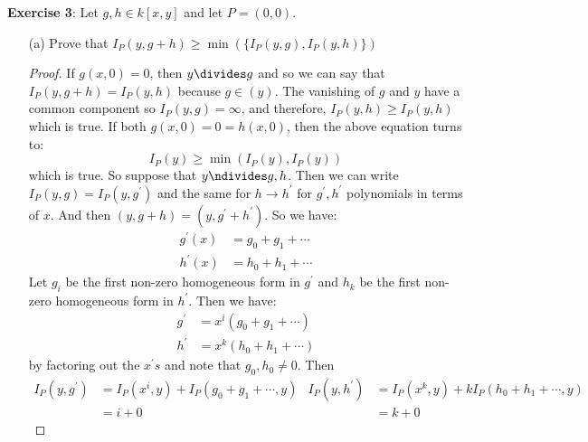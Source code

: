 \documentclass{article}
\begin{document}
\textbf{Exercise 3}: Let $g, h \in k[x, y]$ and let $P = (0, 0)$.
    \begin{itemize}
        \item [(a)] Prove that $I_{P}(y, g + h) \geq \min(\{I_{P}(y, g), I_{P}(y, h)\})$
            \begin{proof}
                If $g(x, 0) = 0$, then $y \divides g$ and so we can say that $I_{P}(y, g + h) = I_{P}(y, h)$ because $g \in(y)$. The vanishing of $g$ and $y$ have a common component so $I_{P}(y, g) = \infty$, and therefore, $I_{P}(y, h) \geq I_{P}(y, h)$ which is true. If both $g(x, 0) = 0 = h(x, 0)$, then the above equation turns to:
                    \begin{equation*}
                        I_{P}(y) \geq \min(I_{P}(y), I_{P}(y))
                    \end{equation*}
                which is true. So suppose that $y  \ndivides g, h$. Then we can write $I_{P}(y, g) = I_{P}(y, g^{\prime})$ and the same for $h \rightarrow h^{\prime}$ for $g^{\prime}, h^{\prime}$ polynomials in terms of $x$. And then $(y, g + h) = (y, g^{\prime} + h^{\prime})$. So we have:
                    \begin{align*}
                        g^{\prime}(x) &= g_{0} + g_{1} + \cdots \\
                        h^{\prime}(x) &= h_{0} + h_{1} + \cdots   
                    \end{align*}
                Let $g_{i}$ be the first non-zero homogeneous form in $g^{\prime}$ and $h_{k}$ be the first non-zero homogeneous form in $h^{\prime}$. Then we have:
                    \begin{align*}
                        g^{\prime} &= x^{i}(g_{0} + g_{1} + \cdots) \\
                        h^{\prime} &= x^{k}(h_{0} + h_{1} + \cdots)   
                    \end{align*}
                by factoring out the $x^{\prime}s$ and note that $g_{0}, h_{0} \neq 0$. Then
                    \begin{align*}
                        I_{P}(y, g^{\prime}) &= I_{P}(x^{i},y) + I_{P}(g_{0} + g_{1} + \cdots, y) & I_{P}(y, h^{\prime}) &= I_{P}(x^{k}, y) +kI_{P}(h_{0} + h_{1} + \cdots, y) \\
                                             &= i + 0                                             &   &= k + 0                                                
                    \end{align*}

\end{proof}
\end{itemize}
\end{document}
